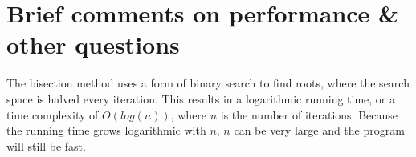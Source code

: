 \documentclass[12pt,letterpaper]{article}
\begin{document}
\begin{spacing}{1}
\begin{spacing}{1.2}
\end{spacing}
\section{Brief comments on performance \& other questions}
The bisection method uses a form of binary search to find roots, where the search space is halved every iteration. This results in a logarithmic running time, or a time complexity of $O(log(n))$, where $n$ is the number of iterations. Because the running time grows logarithmic with $n$, $n$ can be very large and the program will still be fast.

\end{spacing}
\end{document}
